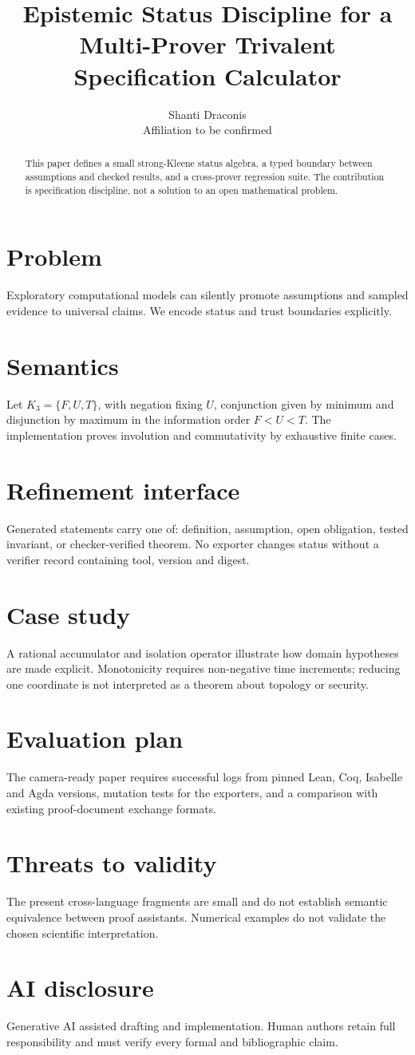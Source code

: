 \documentclass[11pt]{article}
\title{Epistemic Status Discipline for a Multi-Prover Trivalent Specification Calculator}
\author{Shanti Draconis\\Affiliation to be confirmed}
\begin{document}
\maketitle
\begin{abstract}
This paper defines a small strong-Kleene status algebra, a typed boundary
between assumptions and checked results, and a cross-prover regression suite.
The contribution is specification discipline, not a solution to an open
mathematical problem.
\end{abstract}
\section{Problem}
Exploratory computational models can silently promote assumptions and sampled
evidence to universal claims. We encode status and trust boundaries explicitly.
\section{Semantics}
Let $K_3=\{F,U,T\}$, with negation fixing $U$, conjunction given by minimum and
disjunction by maximum in the information order $F<U<T$. The implementation
proves involution and commutativity by exhaustive finite cases.
\section{Refinement interface}
Generated statements carry one of: definition, assumption, open obligation,
tested invariant, or checker-verified theorem. No exporter changes status
without a verifier record containing tool, version and digest.
\section{Case study}
A rational accumulator and isolation operator illustrate how domain hypotheses
are made explicit. Monotonicity requires non-negative time increments; reducing
one coordinate is not interpreted as a theorem about topology or security.
\section{Evaluation plan}
The camera-ready paper requires successful logs from pinned Lean, Coq, Isabelle
and Agda versions, mutation tests for the exporters, and a comparison with
existing proof-document exchange formats.
\section{Threats to validity}
The present cross-language fragments are small and do not establish semantic
equivalence between proof assistants. Numerical examples do not validate the
chosen scientific interpretation.
\section*{AI disclosure}
Generative AI assisted drafting and implementation. Human authors retain full
responsibility and must verify every formal and bibliographic claim.

\end{document}
